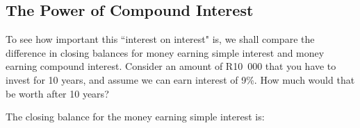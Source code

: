             \subsection{ The Power of Compound Interest}
            \nopagebreak
        \label{m39334*id73519}To see how important this ``interest on interest" is, we shall compare the difference in closing balances for money earning simple interest and money earning compound interest. Consider an amount of R10~000 that you have to invest for 10 years, and assume we can earn interest of 9\%. How much would that be worth after 10 years?\par 
        \label{m39334*id73528}The closing balance for the money earning simple interest is:\par 
        \label{m39334*id73532}\nopagebreak\noindent{}
